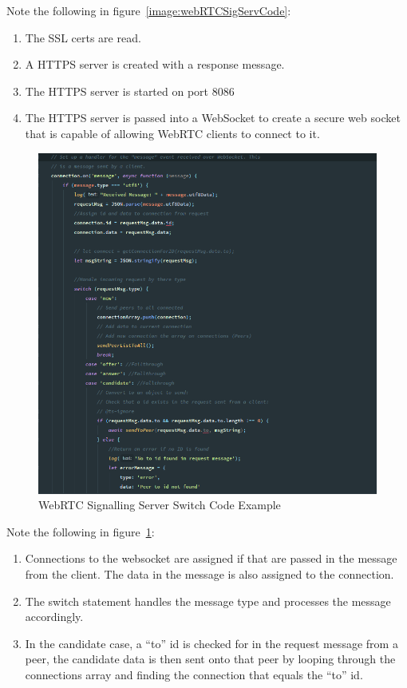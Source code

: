 Note the following in figure~\ref{image:webRTCSigServCode}:
\begin{enumerate}
    \item The SSL certs are read.
    \item A HTTPS server is created with a response message.
    \item The HTTPS server is started on port 8086
    \item The HTTPS server is passed into a WebSocket to create a secure web socket that is capable of allowing WebRTC clients to connect to it.
\end{enumerate}

\begin{figure}[h!]
    \caption{WebRTC Signalling Server  Switch Code Example}
    \label{image:webRTCSigServSwitchCode}
    \centering
    \includegraphics[width=1.0\textwidth]{images/signalling_server_switch_code.png}
\end{figure}

Note the following in figure~\ref{image:webRTCSigServSwitchCode}:
\begin{enumerate}
    \item Connections to the websocket are assigned if that are passed in the message from the client. The data in the message is also assigned to the connection.
    \item The switch statement handles the message type and processes the message accordingly.
    \item In the candidate case, a “to” id is checked for in the request message from a peer, the candidate data is then sent onto that peer by looping through the connections array and finding the connection that equals the “to” id.
\end{enumerate}

